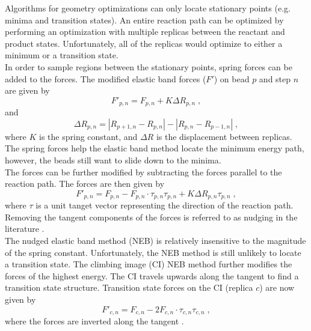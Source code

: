 \documentclass[12pt]{report}
\begin{document}
Algorithms for geometry optimizations can only locate stationary points (e.g.
minima and transition states).
An entire reaction path can be optimized by performing an optimization with
multiple replicas between the reactant and product states.
Unfortunately, all of the replicas would optimize to either a minimum or
a transition state. \\

In order to sample regions between the stationary points, spring forces
can be added to the forces.
The modified elastic band forces ($F'$) on bead $p$ and step $n$ are given
by
\begin{equation}
 F'_{p,n} = F_{p,n}+K\Delta R_{p,n} \; ,
\end{equation}
and
\begin{equation}
 \Delta R_{p,n} = |R_{p+1,n}-R_{p,n}|-|R_{p,n}-R_{p-1,n}| \; ,
\end{equation}
where $K$ is the spring constant, and $\Delta R$ is the displacement between
replicas.
The spring forces help the elastic band method locate the minimum energy
path, however, the beads still want to slide down to the minima. \\

The forces can be further modified by subtracting the forces parallel to the
reaction path.
The forces are then given by \cite{}
\begin{equation}
 F'_{p,n} = F_{p,n}-F_{p,n}\cdot\tau_{p,n}\tau_{p,n}
            +K\Delta R_{p,n}\tau_{p,n} \; ,
\end{equation}
where $\tau$ is a unit tanget vector representing the direction of the
reaction path.
Removing the tangent components of the forces is referred to as nudging in
the literature \cite{}. \\

The nudged elastic band method (NEB) is relatively insensitive to the
magnitude of the spring constant.
Unfortunately, the NEB method is still unlikely to locate a transition state.
The climbing image (CI) NEB method \cite{} further modifies the forces of the
highest energy.
The CI travels upwards along the tangent to find a transition
state structure.
Transition state forces on the CI (replica $c$) are now given by
\begin{equation}
 F'_{c,n} = F_{c,n}-2F_{c,n}\cdot\tau_{c,n}\tau_{c,n} \; ,
\end{equation}
where the forces are inverted along the tangent \cite{}. \\
\end{document}
